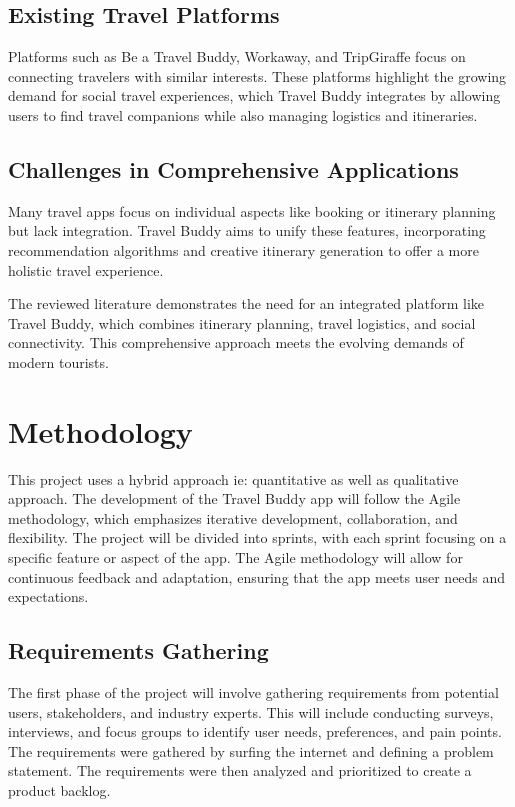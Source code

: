 \documentclass[12pt,a4paper]{report}
\begin{document}
\section{ Existing Travel Platforms}
Platforms such as Be a Travel Buddy, Workaway, and TripGiraffe focus on connecting travelers with similar interests. These platforms highlight the growing demand for social travel experiences, which Travel Buddy integrates by allowing users to find travel companions while also managing logistics and itineraries\cite{beatravelbuddy}\cite{workaway}\cite{tripgiraffe}.

\section{Challenges in Comprehensive Applications}
Many travel apps focus on individual aspects like booking or itinerary planning but lack integration. Travel Buddy aims to unify these features, incorporating recommendation algorithms and creative itinerary generation to offer a more holistic travel experience.


The reviewed literature demonstrates the need for an integrated platform like Travel Buddy, which combines itinerary planning, travel logistics, and social connectivity. This comprehensive approach meets the evolving demands of modern tourists.
\chapter{Methodology}
This project uses a hybrid approach ie: quantitative as well as qualitative approach. The development of the Travel Buddy app will follow the Agile methodology, which emphasizes iterative development, collaboration, and flexibility. The project will be divided into sprints, with each sprint focusing on a specific feature or aspect of the app. The Agile methodology will allow for continuous feedback and adaptation, ensuring that the app meets user needs and expectations.

\section{Requirements Gathering}
The first phase of the project will involve gathering requirements from potential users, stakeholders, and industry experts. This will include conducting surveys, interviews, and focus groups to identify user needs, preferences, and pain points. The requirements were gathered by surfing the internet and defining a problem statement. The requirements were then analyzed and prioritized to create a product backlog.
\end{document}
